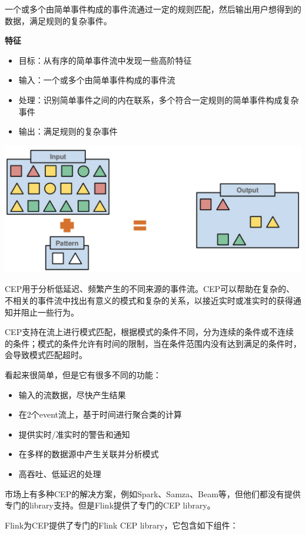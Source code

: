 \documentclass[cn,11pt,chinese]{elegantbook}
\providecommand{\tightlist}{%
  \setlength{\itemsep}{0pt}\setlength{\parskip}{0pt}}
\begin{document}
一个或多个由简单事件构成的事件流通过一定的规则匹配，然后输出用户想得到的数据，满足规则的复杂事件。

\textbf{特征}

\begin{itemize}
\tightlist
\item
  目标：从有序的简单事件流中发现一些高阶特征
\item
  输入：一个或多个由简单事件构成的事件流
\item
  处理：识别简单事件之间的内在联系，多个符合一定规则的简单事件构成复杂事件
\item
  输出：满足规则的复杂事件
\end{itemize}

\includegraphics{images/flink-cep.png}

CEP用于分析低延迟、频繁产生的不同来源的事件流。CEP可以帮助在复杂的、不相关的事件流中找出有意义的模式和复杂的关系，以接近实时或准实时的获得通知并阻止一些行为。

CEP支持在流上进行模式匹配，根据模式的条件不同，分为连续的条件或不连续的条件；模式的条件允许有时间的限制，当在条件范围内没有达到满足的条件时，会导致模式匹配超时。

看起来很简单，但是它有很多不同的功能：

\begin{itemize}
\tightlist
\item
  输入的流数据，尽快产生结果
\item
  在2个event流上，基于时间进行聚合类的计算
\item
  提供实时/准实时的警告和通知
\item
  在多样的数据源中产生关联并分析模式
\item
  高吞吐、低延迟的处理
\end{itemize}

市场上有多种CEP的解决方案，例如Spark、Samza、Beam等，但他们都没有提供专门的library支持。但是Flink提供了专门的CEP
library。

Flink为CEP提供了专门的Flink CEP library，它包含如下组件：
\end{document}
